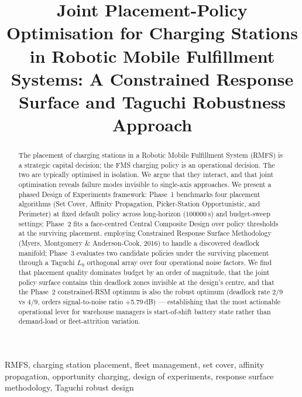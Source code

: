 \documentclass[conference]{IEEEtran}
\begin{document}
\title{Joint Placement-Policy Optimisation for Charging Stations in Robotic Mobile Fulfillment Systems: A Constrained Response Surface and Taguchi Robustness Approach}

\author{
}

\maketitle

\begin{abstract}
The placement of charging stations in a Robotic Mobile Fulfillment System (RMFS) is a strategic capital decision; the FMS charging policy is an operational decision. The two are typically optimised in isolation. We argue that they interact, and that joint optimisation reveals failure modes invisible to single-axis approaches. We present a phased Design of Experiments framework: Phase~1 benchmarks four placement algorithms (Set Cover, Affinity Propagation, Picker-Station Opportunistic, and Perimeter) at fixed default policy across long-horizon ($\SI{100000}{\second}$) and budget-sweep settings; Phase~2 fits a face-centred Central Composite Design over policy thresholds at the surviving placement, employing Constrained Response Surface Methodology (Myers, Montgomery \& Anderson-Cook, 2016) to handle a discovered deadlock manifold; Phase~3 evaluates two candidate policies under the surviving placement through a Taguchi $L_9$ orthogonal array over four operational noise factors. We find that placement quality dominates budget by an order of magnitude, that the joint policy surface contains thin deadlock zones invisible at the design's centre, and that the Phase~2 constrained-RSM optimum is also the robust optimum (deadlock rate 2/9 vs 4/9, orders signal-to-noise ratio +5.79\,dB) --- establishing that the most actionable operational lever for warehouse managers is start-of-shift battery state rather than demand-load or fleet-attrition variation.
\end{abstract}

\begin{IEEEkeywords}
RMFS, charging station placement, fleet management, set cover, affinity propagation, opportunity charging, design of experiments, response surface methodology, Taguchi robust design
\end{IEEEkeywords}
\end{document}
